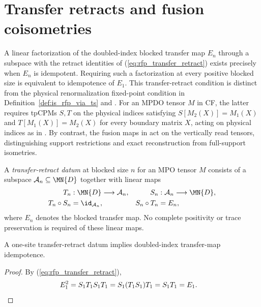 \section{Transfer retracts and fusion coisometries}

A linear factorization of the doubled-index blocked transfer map $E_n$ through
a subspace with the retract identities of (\ref{eq:rfp_transfer_retract}) exists
precisely when $E_n$ is idempotent. Requiring such a factorization at every
positive blocked size is equivalent to idempotence of $E_1$. This
transfer-retract condition is distinct from the physical renormalization
fixed-point condition in Definition~\ref{def:is_rfp_via_ts} and
\cite[Definition~4.1, lines~638--660]{Cirac2016MPDO_arXiv}. For an MPDO tensor
$M$ in CF, the latter requires tpCPMs $S,T$ on the physical indices satisfying
$S[M_2(X)]=M_1(X)$ and $T[M_1(X)]=M_2(X)$ for every boundary matrix $X$, acting
on physical indices as in \cite[lines~1974--2085]{Cirac2016MPDO_arXiv}. By
contrast, the fusion maps in
\cite[Theorem~4.14(ii)--(iii), lines~972--991]{Cirac2016MPDO_arXiv} act on the
vertically read tensors, distinguishing support restrictions and exact
reconstruction from full-support isometries.

\begin{definition}%
    \label{def:mpdo_fusion_isometry}
    \leanok
    A \emph{transfer-retract datum} at blocked size $n$ for an
    MPO tensor $M$ consists of a subspace $\mathcal{A}_n \subseteq \MN{D}$
    together with linear maps
    \begin{align}
        T_n          & :\MN{D}\longrightarrow\mathcal{A}_n,
                     &
        S_n          & :\mathcal{A}_n\longrightarrow\MN{D},
        \notag                                              \\
        T_n\circ S_n & =\id_{\mathcal{A}_n},
                     &
        S_n\circ T_n & =E_n,
        \label{eq:rfp_transfer_retract}
    \end{align}
    where $E_n$ denotes the blocked transfer map. No complete positivity or
    trace preservation is required of these linear maps.
\end{definition}

\begin{lemma}%
    \label{thm:mpdo_transfer_retract_implies_zcl}
    \leanok
    A one-site transfer-retract datum implies doubled-index transfer-map
    idempotence.
\end{lemma}
\begin{proof}\leanok
    By (\ref{eq:rfp_transfer_retract}),
    \begin{align}
        E_1^2
         & =S_1T_1S_1T_1
        =S_1(T_1S_1)T_1
        =S_1T_1
        =E_1.
        \notag
    \end{align}
\end{proof}

